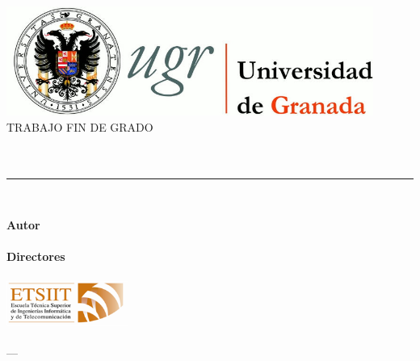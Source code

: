 \begin{titlepage}
	
	\newlength{\centeroffset}
	\setlength{\centeroffset}{-0.5\oddsidemargin}
	\addtolength{\centeroffset}{0.5\evensidemargin}
	\thispagestyle{empty}
	
	\noindent\hspace*{\centeroffset}\begin{minipage}{\textwidth}
		
		\centering
		\includegraphics[width=0.9\textwidth]{gfx/logo_ugr.jpg}\\[1.4cm]
		
		\textsc{ \Large TRABAJO FIN DE GRADO\\[0.2cm]}
		\textsc{ \myDegree}\\[1cm]
		{\huge\bfseries \myTitle\\
		}
		\noindent\rule[-1ex]{\textwidth}{3pt}\\[3.5ex]
		{\large\bfseries \mySubtitle}
	\end{minipage}
	
	\vspace{2.5cm}
	\noindent\hspace*{\centeroffset}\begin{minipage}{\textwidth}
		\centering
		
		\textbf{Autor}\\ {\myName}\\[2.5ex]
		\textbf{Directores}\\
		{\myProf}\\[2cm]
		\includegraphics[width=0.3\textwidth]{gfx/etsiit_logo.png}\\[0.1cm]
		\textsc{\myFaculty}\\
		\textsc{---}\\
		\myTime
	\end{minipage}
	
\end{titlepage}

